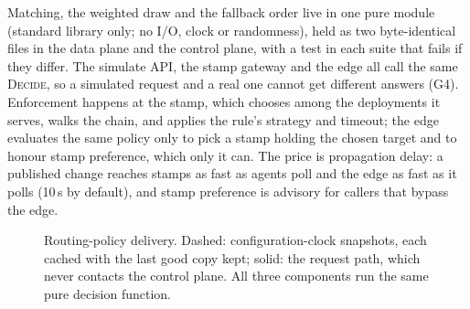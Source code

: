 \documentclass[conference,letterpaper]{IEEEtran}
\newcommand{\code}[1]{\texttt{\small #1}}
\begin{document}
Matching, the weighted draw and the fallback order live in one pure module (standard library
only; no I/O, clock or randomness), held as two byte-identical files in the data plane and the
control plane, with a test in each suite that fails if they differ. The simulate API, the stamp
gateway and the edge all call the same \textsc{Decide}, so a simulated request and a real one
cannot get different answers (G4). Enforcement happens at the stamp, which chooses among the
deployments it serves, walks the chain, and applies the rule's strategy and timeout; the edge
evaluates the same policy only to pick a stamp holding the chosen target and to honour stamp
preference, which only it can. The price is propagation delay: a published change reaches
stamps as fast as agents poll and the edge as fast as it polls (10\,s by default), and stamp
preference is advisory for callers that bypass the edge.

\begin{figure}[t]
\centering
{}
\caption{Routing-policy delivery. Dashed: configuration-clock snapshots, each cached with the
last good copy kept; solid: the request path, which never contacts the control plane. All three
components run the same pure decision function.}
\label{fig:policy}
\end{figure}
\end{document}

